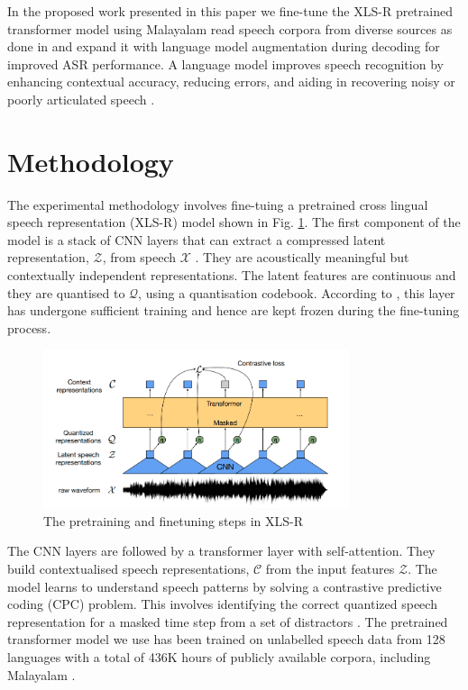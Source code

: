 \documentclass[runningheads]{llncs}
\begin{document}
In the proposed work presented in this paper we fine-tune the XLS-R pretrained transformer model using Malayalam read speech corpora from diverse sources as done in \cite{manohar2023automatic} and expand it with language model augmentation during decoding for improved ASR performance. A language model improves speech recognition by enhancing contextual accuracy, reducing errors, and aiding in recovering noisy or poorly articulated speech \cite{georgescu2021performance}.


\section{Methodology}



The experimental methodology involves fine-tuing a pretrained cross lingual speech representation (XLS-R) model shown in Fig. \ref{finetune}. The first component of the model is a stack of CNN layers that can extract a compressed latent representation, $\mathcal{Z}$, from speech $\mathcal{X}$ \cite{babu2021xls}. They are acoustically meaningful but contextually independent representations. The latent features are continuous and they are quantised to $\mathcal{Q}$, using a quantisation codebook. According to \cite{babu2021xls}, this layer has undergone sufficient training and hence are kept frozen during the fine-tuning process.

\begin{figure}[!h]
    \includegraphics[width=0.8\textwidth]{xlsr.png}
    \centering
    \caption{The pretraining and finetuning steps in XLS-R} 
    \label{finetune}
\end{figure}


The CNN layers are followed by a transformer layer with self-attention. They build contextualised speech representations, $\mathcal{C}$ from the input features $\mathcal{Z}$. The model learns to understand speech patterns by solving a contrastive predictive coding (CPC) problem. This involves identifying the correct quantized speech representation for a masked time step from a set of distractors \cite{babu2021xls}. The pretrained transformer model we use has been trained on unlabelled speech data from 128 languages with a total of 436K hours of publicly available corpora, including Malayalam \cite{babu2021xls}.
\end{document}
